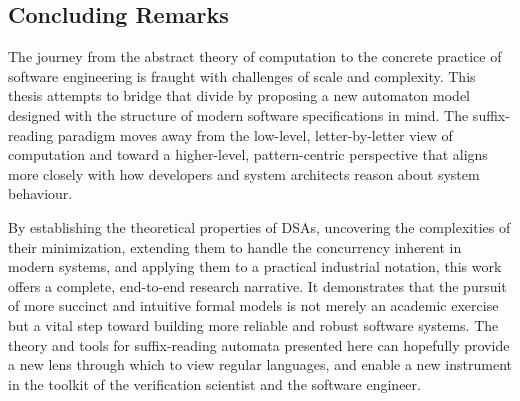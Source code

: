\subsection*{Concluding Remarks}

The journey from the abstract theory of computation to the concrete practice of software engineering is fraught with challenges of scale and complexity. This thesis attempts to bridge that divide by proposing a new automaton model designed with the structure of modern software specifications in mind. The suffix-reading paradigm moves away from the low-level, letter-by-letter view of computation and toward a higher-level, pattern-centric perspective that aligns more closely with how developers and system architects reason about system behaviour.

By establishing the theoretical properties of DSAs, uncovering the complexities of their minimization, extending them to handle the concurrency inherent in modern systems, and applying them to a practical industrial notation, this work offers a complete, end-to-end research narrative. It demonstrates that the pursuit of more succinct and intuitive formal models is not merely an academic exercise but a vital step toward building more reliable and robust software systems. The theory and tools for suffix-reading automata presented here can hopefully provide a new lens through which to view regular languages, and enable a new instrument in the toolkit of the verification scientist and the software engineer.
